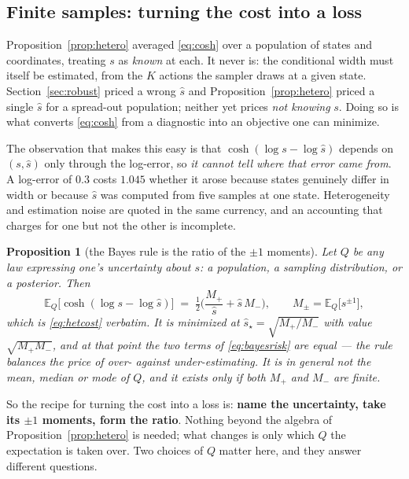 \documentclass[11pt]{article}
\newtheorem{proposition}{Proposition}
\theoremstyle{definition}
\newcommand{\E}{\mathbb{E}}
\begin{document}
\subsection{Finite samples: turning the cost into a loss}
\label{sec:finite}

Proposition~\ref{prop:hetero} averaged \eqref{eq:cosh} over a population of
states and coordinates, treating $s$ as \emph{known} at each. It never is: the
conditional width must itself be estimated, from the $K$ actions the sampler
draws at a given state. Section~\ref{sec:robust} priced a wrong $\hat s$ and
Proposition~\ref{prop:hetero} priced a single $\hat s$ for a spread-out
population; neither yet prices \emph{not knowing} $s$. Doing so is what converts
\eqref{eq:cosh} from a diagnostic into an objective one can minimize.

The observation that makes this easy is that $\cosh(\log s-\log\hat s)$ depends
on $(s,\hat s)$ only through the log-error, so \emph{it cannot tell where that
error came from}. A log-error of $0.3$ costs $1.045$ whether it arose because
states genuinely differ in width or because $\hat s$ was computed from five
samples at one state. Heterogeneity and estimation noise are quoted in the same
currency, and an accounting that charges for one but not the other is incomplete.

\begin{proposition}[the Bayes rule is the ratio of the $\pm1$ moments]
\label{prop:bayes}
Let $Q$ be any law expressing one's uncertainty about $s$: a population, a
sampling distribution, or a posterior. Then
\begin{equation}
  \E_Q\big[\cosh(\log s-\log\hat s)\big]
  \;=\;\tfrac12\Big(\frac{M_+}{\hat s}+\hat s\,M_-\Big),
  \qquad M_\pm=\E_Q\big[s^{\pm1}\big],
  \label{eq:bayesrisk}
\end{equation}
which is \eqref{eq:hetcost} verbatim. It is minimized at
$\hat s_\star=\sqrt{M_+/M_-}$ with value $\sqrt{M_+M_-}$, and at that point the
two terms of \eqref{eq:bayesrisk} are equal --- the rule balances the price of
over- against under-estimating. It is in general \emph{not} the mean, median or
mode of $Q$, and it exists only if both $M_+$ and $M_-$ are finite.
\end{proposition}

So the recipe for turning the cost into a loss is: \textbf{name the uncertainty,
take its $\pm1$ moments, form the ratio}. Nothing beyond the algebra of
Proposition~\ref{prop:hetero} is needed; what changes is only which $Q$ the
expectation is taken over. Two choices of $Q$ matter here, and they answer
different questions.
\end{document}
